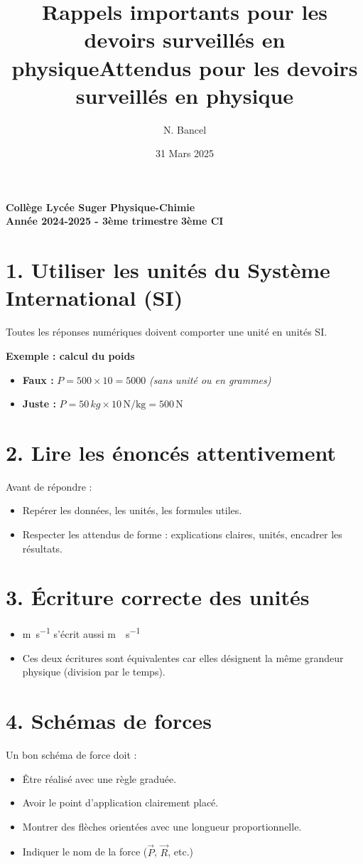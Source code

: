 \documentclass[12pt]{article}
\title{\vspace{-2cm}Rappels importants pour les devoirs surveillés en physique}
\title{Attendus pour les devoirs surveillés en physique}
\author{N. Bancel}
\date{31 Mars 2025}
\begin{document}
\textbf{Collège Lycée Suger}
\hfill
\textbf{Physique-Chimie} \\

\textbf{Année 2024-2025 - 3ème trimestre}
\hfill
\textbf{3ème CI} \par

{\let\newpage\relax\maketitle}

\section*{1. Utiliser les unités du Système International (SI)}
Toutes les réponses numériques doivent comporter une unité en unités SI. 

\textbf{Exemple : calcul du poids}
\begin{itemize}[label=--]
  \item \textbf{Faux :} $P = 500 \times 10 = 5000$ \textit{(sans unité ou en grammes)}
  \item \textbf{Juste :} $P = 50 \, \si{kg} \times 10 \, \si{\newton\per\kilogram} = 500 \, \si{\newton}$
\end{itemize}

\section*{2. Lire les énoncés attentivement}
Avant de répondre :
\begin{itemize}[label=--]
  \item Repérer les données, les unités, les formules utiles.
  \item Respecter les attendus de forme : explications claires, unités, encadrer les résultats.
\end{itemize}

\section*{3. Écriture correcte des unités}
\begin{itemize}[label=--]
  \item \si{\meter\per\second} s'écrit aussi \si{\meter\cdot\second^{-1}}
  \item Ces deux écritures sont équivalentes car elles désignent la même grandeur physique (division par le temps).
\end{itemize}

\section*{4. Schémas de forces}
Un bon schéma de force doit :
\begin{itemize}[label=--]
  \item Être réalisé avec une règle graduée.
  \item Avoir le point d'application clairement placé.
  \item Montrer des flèches orientées avec une longueur proportionnelle.
  \item Indiquer le nom de la force (\og $\vec{P}$\fg{}, $\vec{R}$, etc.)
\end{itemize}
\end{document}
